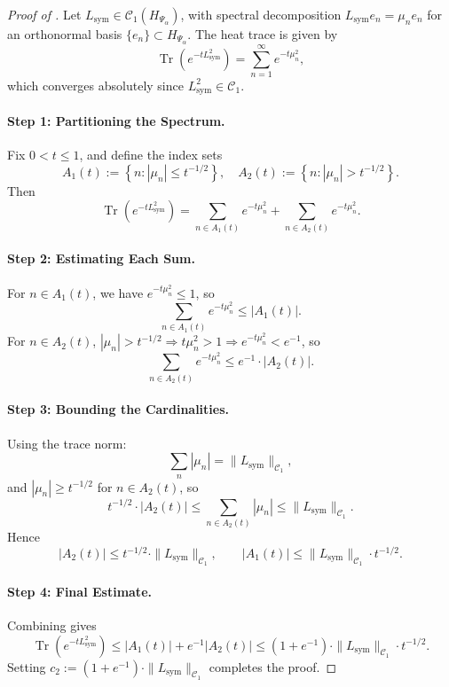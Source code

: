 \begin{proof}[Proof of ]
Let \( L_{\mathrm{sym}} \in \mathcal{C}_1(H_{\Psi_\alpha}) \), with spectral decomposition \( L_{\mathrm{sym}} e_n = \mu_n e_n \) for an orthonormal basis \( \{ e_n \} \subset H_{\Psi_\alpha} \). The heat trace is given by
\[
\operatorname{Tr}(e^{-t L_{\mathrm{sym}}^2}) = \sum_{n=1}^\infty e^{-t \mu_n^2},
\]
which converges absolutely since \( L_{\mathrm{sym}}^2 \in \mathcal{C}_1 \).

\paragraph{Step 1: Partitioning the Spectrum.}
Fix \( 0 < t \le 1 \), and define the index sets
\[
A_1(t) := \left\{ n : |\mu_n| \le t^{-1/2} \right\}, \quad
A_2(t) := \left\{ n : |\mu_n| > t^{-1/2} \right\}.
\]
Then
\[
\operatorname{Tr}(e^{-t L_{\mathrm{sym}}^2})
= \sum_{n \in A_1(t)} e^{-t \mu_n^2} + \sum_{n \in A_2(t)} e^{-t \mu_n^2}.
\]

\paragraph{Step 2: Estimating Each Sum.}
For \( n \in A_1(t) \), we have \( e^{-t \mu_n^2} \le 1 \), so
\[
\sum_{n \in A_1(t)} e^{-t \mu_n^2} \le |A_1(t)|.
\]
For \( n \in A_2(t) \), \( |\mu_n| > t^{-1/2} \Rightarrow t \mu_n^2 > 1 \Rightarrow e^{-t \mu_n^2} < e^{-1} \), so
\[
\sum_{n \in A_2(t)} e^{-t \mu_n^2} \le e^{-1} \cdot |A_2(t)|.
\]

\paragraph{Step 3: Bounding the Cardinalities.}
Using the trace norm:
\[
\sum_n |\mu_n| = \|L_{\mathrm{sym}}\|_{\mathcal{C}_1},
\]
and \( |\mu_n| \ge t^{-1/2} \) for \( n \in A_2(t) \), so
\[
t^{-1/2} \cdot |A_2(t)| \le \sum_{n \in A_2(t)} |\mu_n| \le \|L_{\mathrm{sym}}\|_{\mathcal{C}_1}.
\]
Hence
\[
|A_2(t)| \le t^{-1/2} \cdot \|L_{\mathrm{sym}}\|_{\mathcal{C}_1}, \qquad
|A_1(t)| \le \|L_{\mathrm{sym}}\|_{\mathcal{C}_1} \cdot t^{-1/2}.
\]

\paragraph{Step 4: Final Estimate.}
Combining gives
\[
\operatorname{Tr}(e^{-t L_{\mathrm{sym}}^2})
\le |A_1(t)| + e^{-1} |A_2(t)|
\le (1 + e^{-1}) \cdot \|L_{\mathrm{sym}}\|_{\mathcal{C}_1} \cdot t^{-1/2}.
\]
Setting \( c_2 := (1 + e^{-1}) \cdot \|L_{\mathrm{sym}}\|_{\mathcal{C}_1} \) completes the proof.
\end{proof}
